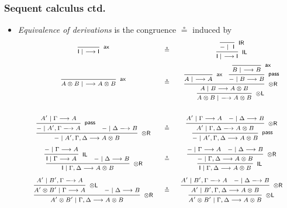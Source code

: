 \documentclass[10pt,t]{beamer}
\newcommand{\I}{\mathsf{I}}
\newcommand{\ot}{\otimes}
\newcommand{\n}{{-}}
\newcommand{\ax}{\mathsf{ax}}
\newcommand{\uf}{\mathsf{pass}}
\newcommand{\IL}{\I\mathsf{L}}
\newcommand{\otL}{\ot\mathsf{L}}
\newcommand{\IR}{\I\mathsf{R}}
\newcommand{\otR}{\ot\mathsf{R}}
\renewcommand{\vdash}{\longrightarrow}
\newcommand{\proofbox}[1]{\begin{tabular}{l} #1 \end{tabular}}
\begin{document}

\begin{frame}

\frametitle{Sequent calculus ctd.}

\begin{itemize}

\item \emph{Equivalence of derivations} is the congruence $\circeq$
  induced by
\[
\scriptsize
\begin{array}{c@{\quad \circeq\quad}c}
\proofbox{
\infer[\ax]{\I \mid ~ \vdash \I}{
}
}
&
\proofbox{
\infer[\IL]{\I \mid ~ \vdash \I}{
  \infer[\IR]{\n \mid ~ \I}{
  }
}
}
\\[12pt]
\proofbox{
\infer[\ax]{A \ot B \mid ~ \vdash A \ot B}{
}
}
&
\proofbox{
\infer[\otL]{A \ot B \mid ~ \vdash A \ot B}{
  \infer[\otR]{A \mid B \vdash A \ot B}{
   \infer[\ax]{A \mid ~ \vdash A}{
   }
   &
   \infer[\uf]{\n \mid B \vdash B}{
     \infer[\ax]{B \mid ~ \vdash B}{
     }
   }
 }
} 
}
\\[36pt]
\proofbox{
\infer[\otR]{\n \mid A', \Gamma, \Delta \vdash A \otimes B}{
  \infer[\uf]{\n \mid A', \Gamma \vdash A}{
    A' \mid \Gamma \vdash A
  }
  &
  \n \mid \Delta \vdash B
}
}
&
\proofbox{
\infer[\uf]{\n \mid A', \Gamma, \Delta \vdash A \otimes B}{
  \infer[\otR]{A' \mid \Gamma, \Delta \vdash A \otimes B}{
    A' \mid \Gamma \vdash A
    &
    \n \mid \Delta \vdash B
  }
}
}
\\[18pt]
\proofbox{
\infer[\otR]{\I \mid \Gamma, \Delta \vdash A \otimes B}{
  \infer[\IL]{\I \mid \Gamma \vdash A}{
    \n \mid \Gamma \vdash A
  }
  &
  \n \mid \Delta \vdash B
}
}
&
\proofbox{
\infer[\IL]{\I \mid \Gamma, \Delta \vdash A \otimes B}{
  \infer[\otR]{\n \mid \Gamma, \Delta \vdash A \otimes B}{
    \n \mid \Gamma \vdash A
    &
    \n \mid \Delta \vdash B
  }
}
}
\\[18pt]
\proofbox{
\infer[\otR]{A' \ot B' \mid \Gamma, \Delta \vdash A \otimes B}{
  \infer[\otL]{A' \ot B' \mid \Gamma \vdash A}{
    A' \mid B', \Gamma \vdash A
  }
  &
  \n \mid \Delta \vdash B
}
}
&
\proofbox{
\infer[\otL]{A' \ot B' \mid \Gamma, \Delta \vdash A \otimes B}{
  \infer[\otR]{A' \mid B', \Gamma, \Delta \vdash A \otimes B}{
    A' \mid B', \Gamma \vdash A
    &
    \n \mid \Delta \vdash B
  }
}
}
\end{array}
\]

\end{itemize}

\end{frame}
\end{document}
